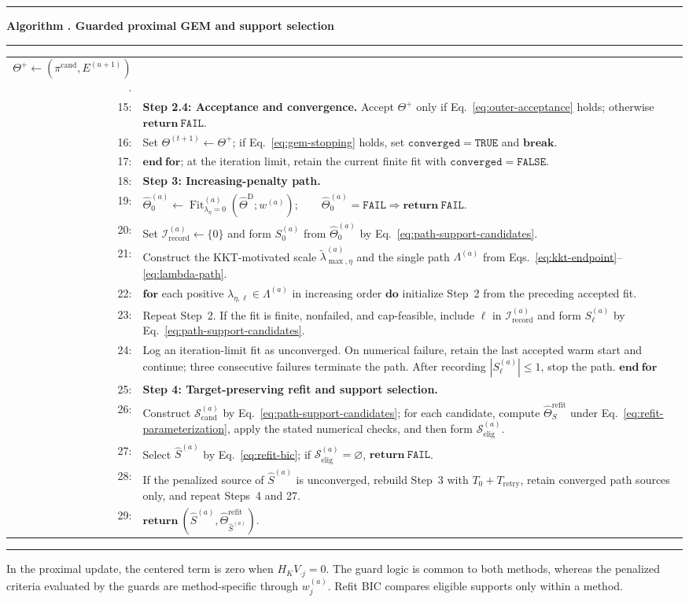 \documentclass[preprint,12pt,authoryear]{elsarticle}
\newcounter{algorithm}
\newenvironment{boxedalgorithm}[1]{%
  \refstepcounter{algorithm}%
  \par\medskip
  \noindent
  \begin{minipage}{\textwidth}
  \hrule\vspace{1pt}
  \textbf{Algorithm \thealgorithm. #1}\par\vspace{1pt}
  \hrule\vspace{2pt}\fontsize{9.0}{9.6}\selectfont
}{%
  \hrule
  \end{minipage}
  \par\medskip
}
\begin{document}
\begin{boxedalgorithm}{Guarded proximal GEM and support selection}
{\begin{tabularx}{\textwidth}{@{}r@{\hspace{0.60em}}X@{}}
$\Theta^+\leftarrow(\pi^{\mathrm{cand}},E^{(u+1)})$.
\tabularnewline
15: & \quad\textbf{Step 2.4: Acceptance and convergence.}
Accept $\Theta^+$ only if Eq.~\eqref{eq:outer-acceptance} holds; otherwise
$\mathbf{return}\ \mathtt{FAIL}$.
\tabularnewline
16: & Set $\Theta^{(t+1)}\leftarrow\Theta^+$; if
Eq.~\eqref{eq:gem-stopping} holds, set
$\mathtt{converged}=\mathtt{TRUE}$ and $\mathbf{break}$.
\tabularnewline
17: & $\mathbf{end\ for}$; at the iteration limit, retain the current finite
fit with $\mathtt{converged}=\mathtt{FALSE}$.
\tabularnewline
18: & \textbf{Step 3: Increasing-penalty path.}
\tabularnewline
19: & $\displaystyle
\widehat\Theta_0^{(a)}\leftarrow
\operatorname{Fit}_{\lambda_\eta=0}^{(a)}
(\widehat\Theta^{\mathrm D};w^{(a)});\qquad
\widehat\Theta_0^{(a)}=\mathtt{FAIL}\Rightarrow
\mathbf{return}\ \mathtt{FAIL}$.
\tabularnewline
20: & Set $\mathcal I_{\mathrm{record}}^{(a)}\leftarrow\{0\}$ and form
$S_0^{(a)}$ from $\widehat\Theta_0^{(a)}$ by
Eq.~\eqref{eq:path-support-candidates}.
\tabularnewline
21: & Construct the KKT-motivated scale
$\widetilde\lambda_{\max,\eta}^{(a)}$ and the single path
$\Lambda^{(a)}$ from Eqs.~\eqref{eq:kkt-endpoint}--\eqref{eq:lambda-path}.
\tabularnewline
22: & $\mathbf{for}$ each positive $\lambda_{\eta,\ell}\in\Lambda^{(a)}$ in
increasing order $\mathbf{do}$ initialize Step~2 from the preceding accepted fit.
\tabularnewline
23: & Repeat Step~2. If the fit is finite, nonfailed, and cap-feasible, include
$\ell$ in $\mathcal I_{\mathrm{record}}^{(a)}$ and form $S_\ell^{(a)}$ by
Eq.~\eqref{eq:path-support-candidates}.
\tabularnewline
24: & Log an iteration-limit fit as unconverged. On numerical failure, retain
the last accepted warm start and continue; three consecutive failures terminate the path. After recording
$|S_\ell^{(a)}|\leq1$, stop the path. $\mathbf{end\ for}$
\tabularnewline
25: & \textbf{Step 4: Target-preserving refit and support selection.}
\tabularnewline
26: & Construct $\mathcal S_{\mathrm{cand}}^{(a)}$ by
Eq.~\eqref{eq:path-support-candidates}; for each candidate, compute
$\widehat\Theta_S^{\mathrm{refit}}$ under
Eq.~\eqref{eq:refit-parameterization}, apply the stated numerical checks, and
then form $\mathcal S_{\mathrm{elig}}^{(a)}$.
\tabularnewline
27: & Select $\widehat S^{(a)}$ by Eq.~\eqref{eq:refit-bic}; if
$\mathcal S_{\mathrm{elig}}^{(a)}=\varnothing$, $\mathbf{return}\ \mathtt{FAIL}$.
\tabularnewline
28: & If the penalized source of $\widehat S^{(a)}$ is unconverged, rebuild
Step~3 with $T_0+T_{\mathrm{retry}}$, retain converged path sources only, and
repeat Steps~4 and 27.
\tabularnewline
29: & $\displaystyle
\mathbf{return}\ (\widehat S^{(a)},
\widehat\Theta_{\widehat S^{(a)}}^{\mathrm{refit}})$.
\tabularnewline
\end{tabularx}}
\end{boxedalgorithm}
In the proximal update, the centered term is zero when
$H_KV_{\cdot j}=0$. The guard logic is common to both methods, whereas the
penalized criteria evaluated by the guards are method-specific through
$w_j^{(a)}$. Refit BIC compares eligible supports only within a method.
\end{document}
